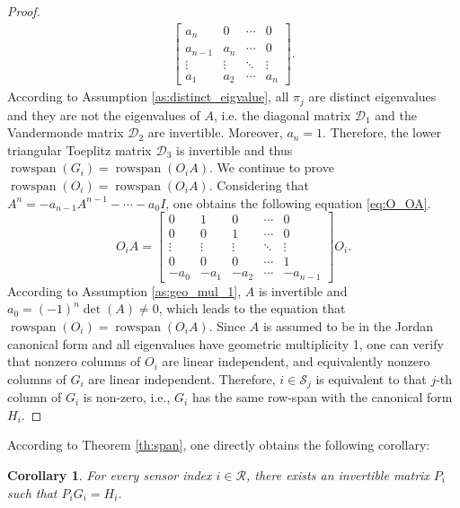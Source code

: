 \documentclass{ieeetrans}   %
\newcommand{\Rc}{{\mathcal{R}}}
\newcommand{\Sc}{{\mathcal{S}}}
\DeclareMathOperator{\rs}{{rowspan}}
\newtheorem{corollary}{\textbf{Corollary}}
\newtheorem*{proof}{\textbf{Proof}}
\begin{document}
\begin{proof}
\begin{align*}
\begin{bmatrix}
			a_n & 0 & \cdots &   0 \\
			a_{n-1} & a_n & \cdots &   0 \\
			\vdots & \vdots & \ddots  & \vdots \\
			a_1 & a_2 & \cdots  & a_n 
		\end{bmatrix}.
	\end{align*}
	According to Assumption \ref{as:distinct_eigvalue}, all $\pi_j$ are distinct eigenvalues and they are not the eigenvalues of $A$, i.e. the diagonal matrix $\mathcal{D}_1$ and the Vandermonde matrix $\mathcal{D}_2$ are invertible. Moreover, $a_n=1$. Therefore, the lower triangular Toeplitz matrix $\mathcal{D}_3$ is invertible and thus $\rs(G_i)=\rs(O_i A)$. 		
	We continue to prove $\rs(O_i)=\rs(O_i A)$. Considering that $A^n=-a_{n-1}A^{n-1}-\cdots-a_0 I$, one obtains the following equation \eqref{eq:O_OA}.
	\begin{equation}
		\label{eq:O_OA}
			O_i A=
		\begin{bmatrix}
			0 & 1 & 0 &  \cdots & 0 \\
			0 & 0 & 1 &  \cdots & 0 \\
			\vdots & \vdots & \vdots & \ddots & \vdots \\
			0 & 0 & 0 &  \cdots & 1 \\
			-a_0 & -a_1 & -a_2 & \cdots &  -a_{n-1}
		\end{bmatrix}
		O_i .
	\end{equation}	%
	According to Assumption \ref{as:geo_mul_1}, $A$ is invertible and $a_0=(-1)^n\det(A)\neq 0$, which leads to the equation that $\rs(O_i)=\rs(O_i A)$.
	Since $A$ is assumed to be in the Jordan canonical form and all eigenvalues have geometric multiplicity 1, one can verify that nonzero columns of $O_i$ are linear independent, and equivalently nonzero columns of $G_i$ are linear independent. Therefore, $i\in\Sc_j$ is equivalent to that $j$-th column of $G_i$ is non-zero, i.e., $G_i$ has the same row-span with the canonical form $H_i$.
\end{proof}
According to Theorem \ref{th:span}, one directly obtains the following corollary:
\begin{corollary}\label{co:P_i}
	For every sensor index $i\in\Rc$, there exists an invertible matrix $P_i$ such that $P_iG_i=H_i$.
\end{corollary}
\end{document}
